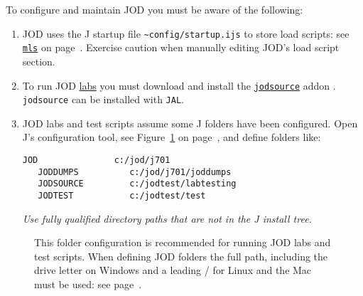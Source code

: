 To configure and maintain JOD you must be aware of the following:
\begin{enumerate}
	\item JOD uses the J startup file \verb|~config/startup.ijs| to store load scripts: see 
	\hyperlink{il:mls}{\texttt{mls}} on page~\pageref{ss:mls}.  Exercise caution when manually
	editing JOD's load script section.
	\item To run JOD \href{http://www.jsoftware.com/help/user/lab_system_overview.htm}{labs} you must download and install the
	 \href{http://www.jsoftware.com/jwiki/Addons/general/jodsource}{\texttt{jodsource}} addon \cite{baker:jodsource}. 
	 \texttt{jodsource} can be installed with \texttt{JAL}.
	\item JOD labs and test scripts assume some J folders have been configured.  Open J's
	configuration tool, see Figure~\ref{eps:jodfolders} on 
   page~\pageref{eps:jodfolders}, and
	define folders like:
	\begin{lstlisting}[frame=single,framerule=0pt,label=lst:foldercfg]
   JOD               c:/jod/j701
   JODDUMPS          c:/jod/j701/joddumps
   JODSOURCE         c:/jodtest/labtesting
   JODTEST           c:/jodtest/test
  \end{lstlisting}
  \emph{Use fully qualified directory paths that are not in the J install tree.}
\end{enumerate} 



\begin{figure}[htbp]
  \centering
  \hfill
\caption[JOD Folders]{This folder configuration is recommended for 
running JOD labs and test scripts. 
When defining JOD folders the full path, including the drive letter on Windows and a
leading / for Linux and the Mac must be used: see page~\pageref{lst:foldercfg}.} 
  \label{eps:jodfolders}
\end{figure}
